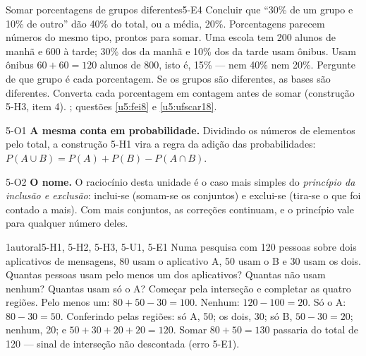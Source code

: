 \begin{erro}{Somar porcentagens de grupos diferentes}{5-E4}
 Concluir que \enquote{30\% de um grupo e 10\% de outro} dão 40\% do total, ou a média, 20\%.
 Porcentagens parecem números do mesmo tipo, prontos para somar.
 Uma escola tem 200 alunos de manhã e 600 à tarde; 30\% dos da manhã e 10\% dos da tarde usam ônibus. Usam ônibus $60+60=120$ alunos de 800, isto é, 15\% — nem 40\% nem 20\%.
 Pergunte de que grupo é cada porcentagem. Se os grupos são diferentes, as bases são diferentes.
 Converta cada porcentagem em contagem antes de somar (construção 5-H3, item 4).
 ; questões \ref{u5:fei8} e \ref{u5:ufscar18}.
\end{erro}

\Observacoes

\begin{obs}{5-O1}
\textbf{A mesma conta em probabilidade.} Dividindo os números de elementos pelo total, a construção 5-H1 vira a regra da adição das probabilidades: $P(A\cup B)=P(A)+P(B)-P(A\cap B)$.
\end{obs}

\begin{obs}{5-O2}
\textbf{O nome.} O raciocínio desta unidade é o caso mais simples do \emph{princípio da inclusão e exclusão}: inclui-se (somam-se os conjuntos) e exclui-se (tira-se o que foi contado a mais). Com mais conjuntos, as correções continuam, e o princípio vale para qualquer número deles.
\end{obs}

\Exemplos

\begin{exemplo}{}{1}{autoral}{5-H1, 5-H2, 5-H3, 5-U1, 5-E1}
\label{ex:u5:apps}
Numa pesquisa com 120 pessoas sobre dois aplicativos de mensagens, 80 usam o aplicativo A, 50 usam o B e 30 usam os dois. Quantas pessoas usam pelo menos um dos aplicativos? Quantas não usam nenhum? Quantas usam só o A?
\plano Começar pela interseção e completar as quatro regiões.
\resolucao Pelo menos um: $80+50-30=100$. Nenhum: $120-100=20$. Só o A: $80-30=50$. Conferindo pelas regiões: só A, 50; os dois, 30; só B, $50-30=20$; nenhum, 20; e $50+30+20+20=120$.
\comentario Somar $80+50=130$ passaria do total de 120 — sinal de interseção não descontada (erro 5-E1).
\end{exemplo}

